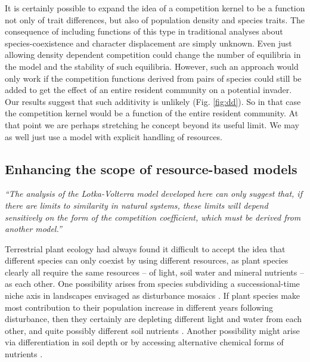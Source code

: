 \documentclass[a4paper,11pt]{article}
\begin{document}
It is certainly possible to expand the idea of a competition kernel to
be a function not only of trait differences, but also of population
density and species traits. The consequence of including functions of
this type in traditional analyses about species-coexistence and
character displacement are simply unknown.  Even just allowing density
dependent competition could change the number of equilibria in the
model and the stability of such equilibria.
%
However, such an approach would only work if the competition functions
derived from pairs of species could still be added to get the effect
of an entire resident community on a potential invader.
Our results suggest that such additivity is unlikely
(Fig. \ref{fig:dd}). So in that case the competition kernel would be a
function of the entire resident community.  At that point we are
perhaps stretching he concept beyond its useful limit. We may as well
just use a model with explicit handling of resources.

\subsection{Enhancing the scope of resource-based models}

\emph{``The analysis of the Lotka-Volterra model developed here can only
suggest that, if there are limits to similarity in natural systems, these
limits will depend sensitively on the form of the competition coefficient,
which must be derived from another model.''}\citep{Abrams-1975}

Terrestrial plant ecology had always found it difficult to accept the
idea that different species can only coexist by using different
resources, as plant species clearly all require the same resources -- of
light, soil water and mineral nutrients -- as each other. One possibility
arises from species subdividing a successional-time niche axis in
landscapes envisaged as disturbance mosaics \citep{Connell-1978}. If
plant species make most contribution to their population increase in
different years following disturbance, then they certainly are
depleting different light and water from each other, and quite
possibly different soil nutrients \citep{Moorcroft-2001}. Another
possibility might arise via differentiation in soil depth or by accessing
alternative chemical forms of nutrients \citep{Tilman-1977}.
\end{document}
